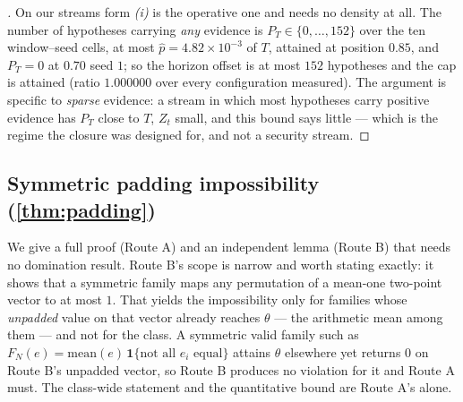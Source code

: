 \begin{proof}[]
On our streams form \emph{(i)} is the operative one and needs no density at all. The number of
hypotheses carrying \emph{any} evidence is $P_T \in \{0,\dots,152\}$ over the ten window--seed cells,
at most $\hat p = 4.82\times10^{-3}$ of $T$, attained at position $0.85$, and $P_T=0$ at $0.70$ seed
$1$; so the horizon offset is at most $152$ hypotheses and the cap is attained (ratio $1.000000$ over
every configuration measured). The argument is specific to \emph{sparse} evidence: a stream in which
most hypotheses carry positive evidence has $P_T$ close to $T$, $Z_t$ small, and this bound says
little --- which is the regime the closure was designed for, and not a security stream.
\end{proof}

\subsection{Symmetric padding impossibility (\cref{thm:padding})}

We give a full proof (Route A) and an independent lemma (Route B) that needs no domination result.
Route B's scope is narrow and worth stating exactly: it shows that a symmetric family maps any
permutation of a mean-one two-point vector to at most $1$. That yields the impossibility only for
families whose \emph{unpadded} value on that vector already reaches $\theta$ --- the arithmetic mean
among them --- and not for the class. A symmetric valid family such as
$F_N(e)=\mathrm{mean}(e)\,\mathbf 1\{\text{not all }e_i\text{ equal}\}$ attains $\theta$ elsewhere yet
returns $0$ on Route B's unpadded vector, so Route B produces no violation for it and Route A must.
The class-wide statement and the quantitative bound are Route A's alone.

